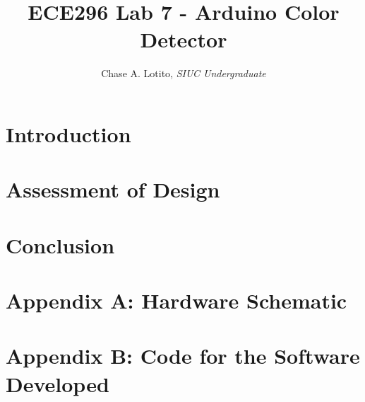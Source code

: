 \documentclass{IEEEtran}
\title{ECE296 Lab 7 - Arduino Color Detector}
\author{Chase A. Lotito, \textit{SIUC Undergraduate}}
\date{}
\begin{document}
\maketitle %

\section{Introduction} 

\section{Assessment of Design}

\section{Conclusion}

\section*{Appendix A: Hardware Schematic}

\section*{Appendix B: Code for the Software Developed}
\end{document}
